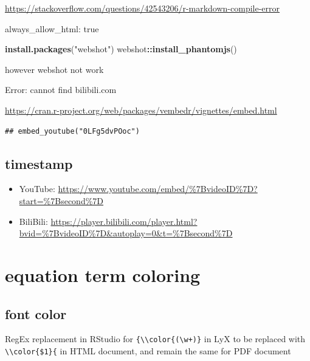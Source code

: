\documentclass[
]{book}
\newenvironment{Shaded}{\begin{snugshade}}{\end{snugshade}}
\newcommand{\FunctionTok}[1]{\textcolor[rgb]{0.13,0.29,0.53}{\textbf{#1}}}
\newcommand{\NormalTok}[1]{#1}
\newcommand{\SpecialCharTok}[1]{\textcolor[rgb]{0.81,0.36,0.00}{\textbf{#1}}}
\newcommand{\StringTok}[1]{\textcolor[rgb]{0.31,0.60,0.02}{#1}}
\providecommand{\tightlist}{%
  \setlength{\itemsep}{0pt}\setlength{\parskip}{0pt}}
\theoremstyle{definition}
\theoremstyle{definition}
\theoremstyle{definition}
\theoremstyle{definition}
\theoremstyle{remark}
\begin{document}
\url{https://stackoverflow.com/questions/42543206/r-markdown-compile-error}

always\_allow\_html: true

\begin{Shaded}
\begin{Highlighting}[]
\FunctionTok{install.packages}\NormalTok{(}\StringTok{"webshot"}\NormalTok{)}
\NormalTok{webshot}\SpecialCharTok{::}\FunctionTok{install\_phantomjs}\NormalTok{()}
\end{Highlighting}
\end{Shaded}

however webshot not work

Error: cannot find bilibili.com

\url{https://cran.r-project.org/web/packages/vembedr/vignettes/embed.html}

\begin{verbatim}
## embed_youtube("0LFg5dvPOoc")
\end{verbatim}

\hypertarget{timestamp}{%
\subsection{timestamp}\label{timestamp}}

\begin{itemize}
\tightlist
\item
  YouTube: \url{https://www.youtube.com/embed/\%7BvideoID\%7D?start=\%7Bsecond\%7D}
\item
  BiliBili: \url{https://player.bilibili.com/player.html?bvid=\%7BvideoID\%7D\&autoplay=0\&t=\%7Bsecond\%7D}
\end{itemize}

\hypertarget{equation-term-coloring}{%
\section{equation term coloring}\label{equation-term-coloring}}

\hypertarget{font-color}{%
\subsection{font color}\label{font-color}}

RegEx replacement in RStudio for \texttt{\{\textbackslash{}\textbackslash{}color\{(\textbackslash{}w+)\}} in LyX to be replaced with \texttt{\textbackslash{}\textbackslash{}color\{\$1\}\{} in HTML document, and remain the same for PDF document
\end{document}
